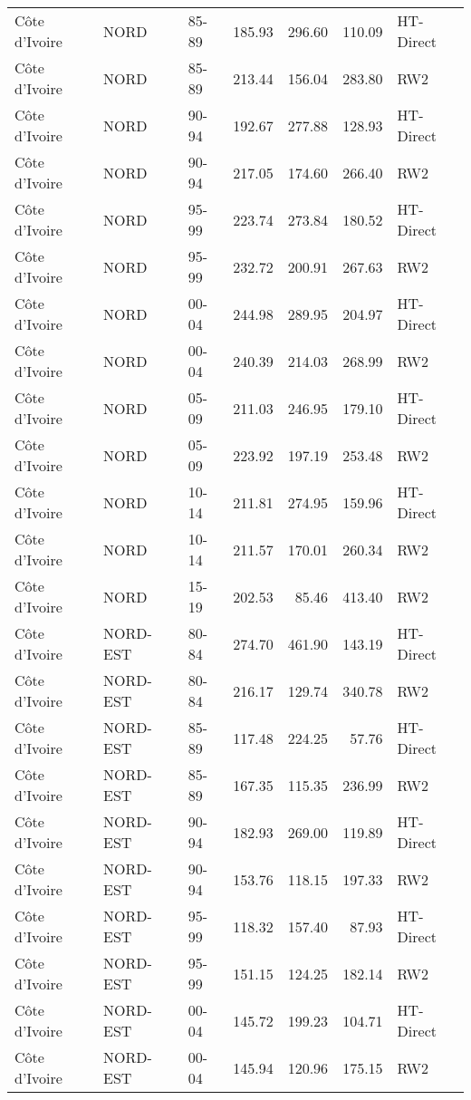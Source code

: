 \begin{longtable}{lllrrrl}
  C\^{o}te d'Ivoire & NORD & 85-89 & 185.93 & 296.60 & 110.09 & HT-Direct \\ 
  C\^{o}te d'Ivoire & NORD & 85-89 & 213.44 & 156.04 & 283.80 & RW2 \\ 
  C\^{o}te d'Ivoire & NORD & 90-94 & 192.67 & 277.88 & 128.93 & HT-Direct \\ 
  C\^{o}te d'Ivoire & NORD & 90-94 & 217.05 & 174.60 & 266.40 & RW2 \\ 
  C\^{o}te d'Ivoire & NORD & 95-99 & 223.74 & 273.84 & 180.52 & HT-Direct \\ 
  C\^{o}te d'Ivoire & NORD & 95-99 & 232.72 & 200.91 & 267.63 & RW2 \\ 
  C\^{o}te d'Ivoire & NORD & 00-04 & 244.98 & 289.95 & 204.97 & HT-Direct \\ 
  C\^{o}te d'Ivoire & NORD & 00-04 & 240.39 & 214.03 & 268.99 & RW2 \\ 
  C\^{o}te d'Ivoire & NORD & 05-09 & 211.03 & 246.95 & 179.10 & HT-Direct \\ 
  C\^{o}te d'Ivoire & NORD & 05-09 & 223.92 & 197.19 & 253.48 & RW2 \\ 
  C\^{o}te d'Ivoire & NORD & 10-14 & 211.81 & 274.95 & 159.96 & HT-Direct \\ 
  C\^{o}te d'Ivoire & NORD & 10-14 & 211.57 & 170.01 & 260.34 & RW2 \\ 
  C\^{o}te d'Ivoire & NORD & 15-19 & 202.53 & 85.46 & 413.40 & RW2 \\ 
  C\^{o}te d'Ivoire & NORD-EST & 80-84 & 274.70 & 461.90 & 143.19 & HT-Direct \\ 
  C\^{o}te d'Ivoire & NORD-EST & 80-84 & 216.17 & 129.74 & 340.78 & RW2 \\ 
  C\^{o}te d'Ivoire & NORD-EST & 85-89 & 117.48 & 224.25 & 57.76 & HT-Direct \\ 
  C\^{o}te d'Ivoire & NORD-EST & 85-89 & 167.35 & 115.35 & 236.99 & RW2 \\ 
  C\^{o}te d'Ivoire & NORD-EST & 90-94 & 182.93 & 269.00 & 119.89 & HT-Direct \\ 
  C\^{o}te d'Ivoire & NORD-EST & 90-94 & 153.76 & 118.15 & 197.33 & RW2 \\ 
  C\^{o}te d'Ivoire & NORD-EST & 95-99 & 118.32 & 157.40 & 87.93 & HT-Direct \\ 
  C\^{o}te d'Ivoire & NORD-EST & 95-99 & 151.15 & 124.25 & 182.14 & RW2 \\ 
  C\^{o}te d'Ivoire & NORD-EST & 00-04 & 145.72 & 199.23 & 104.71 & HT-Direct \\ 
  C\^{o}te d'Ivoire & NORD-EST & 00-04 & 145.94 & 120.96 & 175.15 & RW2 \\ 

\end{longtable}
